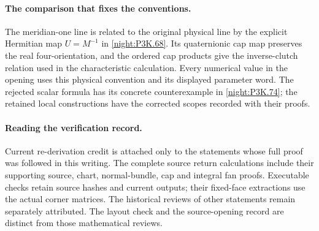 \paragraph{The comparison that fixes the conventions.}
The meridian-one line is related to the original physical line by
the explicit Hermitian map $U=M^{-1}$ in \cref{night:P3K.68}.
Its quaternionic cap map preserves the real four-orientation, and
the ordered cap products give the inverse-clutch relation used in
the characteristic calculation. Every numerical value in the
opening uses this physical convention and its displayed parameter
word. The rejected scalar formula has its concrete counterexample
in \cref{night:P3K.74}; the retained local constructions have the
corrected scopes recorded with their proofs.

\paragraph{Reading the verification record.}
Current re-derivation credit is attached only to the statements
whose full proof was followed in this writing. The complete source
return calculations include their supporting source, chart,
normal-bundle, cap and integral fan proofs. Executable checks retain
source hashes and current outputs; their fixed-face extractions use
the actual corner matrices. The historical reviews of other
statements remain separately attributed. The layout check and
the source-opening record are distinct from those mathematical
reviews.
